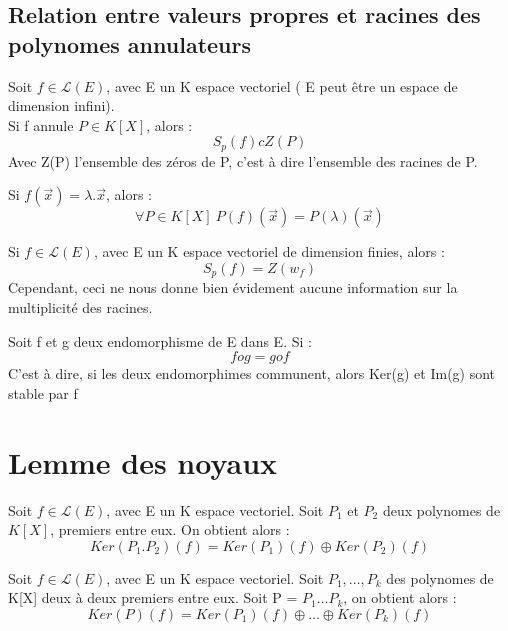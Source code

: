 \subsection{Relation entre valeurs propres et racines des polynomes annulateurs}
\begin{prop}
Soit $f \in \mathcal{L}(E)$, avec E un K espace vectoriel ( E peut être un espace de dimension infini).\\
Si f annule $P \in K[X]$, alors :
$$S_p(f) c Z(P)$$
Avec Z(P) l'ensemble des zéros de P, c'est à dire l'ensemble des racines de P.
\end{prop}
\begin{lemme}
Si $f(\overrightarrow{x}) = \lambda.\overrightarrow{x}$, alors :
$$\forall P \in K[X]~ P(f)(\overrightarrow{x}) = P(\lambda)(\overrightarrow{x})$$
\end{lemme}
\begin{prop}
Si $f \in \mathcal{L}(E)$, avec E un K espace vectoriel de dimension finies, alors :
$$S_p(f) = Z(w_f)$$
Cependant, ceci ne nous donne bien évidement aucune information sur la multiplicité des racines.
\end{prop}
\begin{prop}
Soit f et g deux endomorphisme de E dans E. Si : 
$$fog = gof$$
C'est à dire, si les deux endomorphimes communent, alors Ker(g) et Im(g) sont stable par f
\end{prop}
\section{Lemme des noyaux}
\begin{prop}
Soit $f \in \mathcal{L}(E)$, avec E un K espace vectoriel. Soit $P_1$ et $P_2$ deux polynomes de $K[X]$, premiers entre eux. On obtient alors : 
$$Ker(P_1.P_2)(f) = Ker(P_1)(f) \oplus Ker(P_2)(f)$$
\end{prop}
\begin{gene}
Soit $f \in \mathcal{L}(E)$, avec E un K espace vectoriel. Soit $P_1,\dots,P_k$ des polynomes de K[X] deux à deux premiers entre eux. Soit P = $P_1\dots P_k$, on obtient alors : 
$$Ker(P)(f) = Ker(P_1)(f) \oplus \dots \oplus Ker(P_k)(f)$$
\end{gene}
